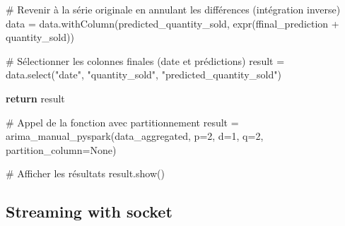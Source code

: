 \documentclass[
  letterpaper,
  DIV=11,
  numbers=noendperiod]{scrartcl}
\newenvironment{Shaded}{\begin{snugshade}}{\end{snugshade}}
\newcommand{\CommentTok}[1]{\textcolor[rgb]{0.37,0.37,0.37}{#1}}
\newcommand{\ControlFlowTok}[1]{\textcolor[rgb]{0.00,0.23,0.31}{\textbf{#1}}}
\newcommand{\DecValTok}[1]{\textcolor[rgb]{0.68,0.00,0.00}{#1}}
\newcommand{\NormalTok}[1]{\textcolor[rgb]{0.00,0.23,0.31}{#1}}
\newcommand{\OperatorTok}[1]{\textcolor[rgb]{0.37,0.37,0.37}{#1}}
\newcommand{\SpecialStringTok}[1]{\textcolor[rgb]{0.13,0.47,0.30}{#1}}
\newcommand{\StringTok}[1]{\textcolor[rgb]{0.13,0.47,0.30}{#1}}
\newcommand{\VariableTok}[1]{\textcolor[rgb]{0.07,0.07,0.07}{#1}}
\begin{document}
\begin{Shaded}
\begin{Highlighting}[]
    \CommentTok{\# Revenir à la série originale en annulant les différences (intégration inverse)}
\NormalTok{    data }\OperatorTok{=}\NormalTok{ data.withColumn(}\StringTok{\textquotesingle{}predicted\_quantity\_sold\textquotesingle{}}\NormalTok{, expr(}\SpecialStringTok{f\textquotesingle{}final\_prediction + quantity\_sold\textquotesingle{}}\NormalTok{))}

    \CommentTok{\# Sélectionner les colonnes finales (date et prédictions)}
\NormalTok{    result }\OperatorTok{=}\NormalTok{ data.select(}\StringTok{"date"}\NormalTok{, }\StringTok{"quantity\_sold"}\NormalTok{, }\StringTok{"predicted\_quantity\_sold"}\NormalTok{)}

    \ControlFlowTok{return}\NormalTok{ result}

\CommentTok{\# Appel de la fonction avec partitionnement}
\NormalTok{result }\OperatorTok{=}\NormalTok{ arima\_manual\_pyspark(data\_aggregated, p}\OperatorTok{=}\DecValTok{2}\NormalTok{, d}\OperatorTok{=}\DecValTok{1}\NormalTok{, q}\OperatorTok{=}\DecValTok{2}\NormalTok{, partition\_column}\OperatorTok{=}\VariableTok{None}\NormalTok{)}

\CommentTok{\# Afficher les résultats}
\NormalTok{result.show()}
\end{Highlighting}
\end{Shaded}

\subsection{Streaming with socket}\label{streaming-with-socket}
\end{document}

